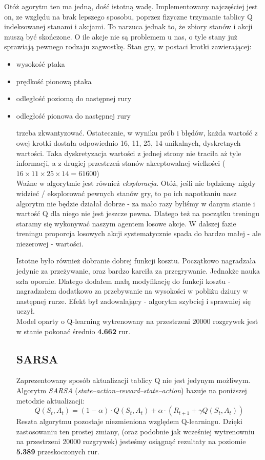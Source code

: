 \documentclass[12pt, A4]{article}
\begin{document}
	Otóż agorytm ten ma jedną, dość istotną wadę. Implementowany najczęściej jest on, ze względu na brak lepszego sposobu, poprzez fizyczne trzymanie tablicy Q indeksowanej stanami i akcjami. To narzuca jednak to, że zbiory stanów i akcji muszą być skończone. O ile akcje nie są problemem u nas, o tyle stany już sprawiają pewnego rodzaju zagwostkę. Stan gry, w postaci krotki zawierającej:
	\begin{itemize} 
	\item wysokość ptaka
	\item prędkość pionową ptaka
	\item	odległość poziomą do następnej rury
	\item odległość pionowa do następnej rury
	\begin{itemize}
	trzeba zkwantyzować. Ostatecznie, w wyniku prób i błędów, każda wartość z owej krotki dostała odpowiednio 16, 11, 25, 14 unikalnych, dyskretnych wartości. Taka dyskretyzacja wartości z jednej strony nie traciła aż tyle informacji, a z drugiej przestrzeń stanów akceptowalnej wielkości ($16\times11\times25\times14 = 61600$)\\

	Ważne w algorytmie jest również \textit{eksploracja}. Otóż, jeśli nie będziemy nigdy widzieć / eksplorować pewnych stanów gry, to po ich napotkaniu nasz algorytm nie będzie działał dobrze - za mało razy byliśmy w danym stanie i wartość Q dla niego nie jest jeszcze pewna. Dlatego też na początku treningu staramy się wykonywać naszym agentem losowe akcje. W dalszej fazie treningu proporcja losowych akcji systematycznie spada do bardzo małej - ale niezerowej - wartości.    

	Istotne było również dobranie dobrej funkcji kosztu. Początkowo nagradzała jedynie za przeżywanie, oraz bardzo karciła za przegrywanie. Jednakże nauka szła opornie. Dlatego dodałem małą modyfikację do funkcji kosztu - nagradzałem dodatkowo za przebywanie na wysokości w pobliżu dziury w następnej rurze. Efekt był zadowalający - algorytm szybciej i sprawniej się uczył. \\
	Model oparty o Q-learning wytrenowany na przestrzeni 20000 rozgrywek jest w stanie pokonać średnio \textbf{4.662} rur.

	\subsection{SARSA}
	Zaprezentowany sposób aktualizacji tablicy Q nie jest jedynym możliwym. Algorytm \textit{SARSA} (\textit{state–action–reward–state–action}) bazuje na poniższej metodzie aktualizacji:
	\[	Q(S_t, A_t) = (1-\alpha)\cdot Q(S_t, A_t) + \alpha \cdot \left( R_{t+1} + \gamma Q(S_t, A_t) \right)	\]
	Reszta algorytmu pozostaje niezmieniona względem Q-learningu. Dzięki zastosowaniu ten prostej zmiany, (oraz podobnie jak wcześniej wytrenowniu na przestrzeni 20000 rozgrywek) jesteśmy osiągnąć rezultaty na poziomie \textbf{5.389} przeskoczonych rur.\\


\end{itemize}
\end{itemize}
\end{document}
